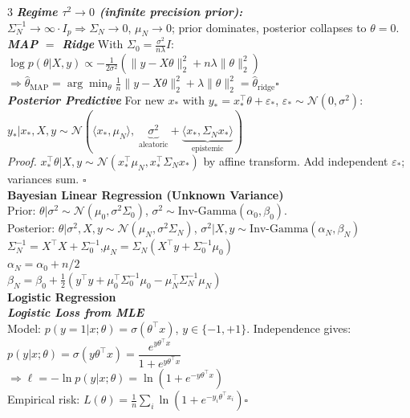 \documentclass[a4paper,7pt]{article}
\begin{document}
\begin{multicols*}{3}
\textit{\textbf{Regime $\tau^2\to 0$ (infinite precision prior):}}\\
$\Sigma_N^{-1}\to\infty\cdot I_p\Rightarrow\Sigma_N\to 0$, $\mu_N\to 0$; prior dominates, posterior collapses to $\theta=0$.\\

\textit{\textbf{MAP $=$ Ridge}} With $\Sigma_0=\frac{\sigma^2}{n\lambda}I$:\\
$\log p(\theta|X,y)\propto-\tfrac{1}{2\sigma^2}(\|y-X\theta\|_2^2+n\lambda\|\theta\|_2^2)$\\
$\Rightarrow\hat\theta_\mathrm{MAP}=\arg\min_\theta\tfrac{1}{n}\|y-X\theta\|_2^2+\lambda\|\theta\|_2^2=\hat\theta_\mathrm{ridge}$\hfill$\square$\\

\textit{\textbf{Posterior Predictive}} For new $x_*$ with $y_*=x_*^\top\theta+\varepsilon_*$, $\varepsilon_*\sim\mathcal{N}(0,\sigma^2)$:\\
$y_*|x_*,X,y\sim\mathcal{N}(\langle x_*,\mu_N\rangle,\;\underbrace{\sigma^2}_{\text{aleatoric}}+\underbrace{\langle x_*,\Sigma_N x_*\rangle}_{\text{epistemic}})$\\
\textit{Proof.} $x_*^\top\theta|X,y\sim\mathcal{N}(x_*^\top\mu_N,x_*^\top\Sigma_N x_*)$ by affine transform. Add independent $\varepsilon_*$; variances sum. \hfill$\square$\\

\textbf{Bayesian Linear Regression (Unknown Variance)}\\
Prior: $\theta|\sigma^2\sim\mathcal{N}(\mu_0,\sigma^2\Sigma_0)$, $\sigma^2\sim\mathrm{Inv\text{-}Gamma}(\alpha_0,\beta_0)$.\\
Posterior: $\theta|\sigma^2,X,y\sim\mathcal{N}(\mu_N,\sigma^2\Sigma_N)$, $\sigma^2|X,y\sim\mathrm{Inv\text{-}Gamma}(\alpha_N,\beta_N)$\\
$\Sigma_N^{-1}=X^\top X+\Sigma_0^{-1}$,\quad $\mu_N=\Sigma_N(X^\top y+\Sigma_0^{-1}\mu_0)$\\
$\alpha_N=\alpha_0+n/2$\\
$\beta_N=\beta_0+\tfrac{1}{2}(y^\top y+\mu_0^\top\Sigma_0^{-1}\mu_0-\mu_N^\top\Sigma_N^{-1}\mu_N)$\\

\textbf{Logistic Regression}\\

\textit{\textbf{Logistic Loss from MLE}}\\
Model: $p(y=1|x;\theta)=\sigma(\theta^\top x)$, $y\in\{-1,+1\}$. Independence gives:\\
$p(y|x;\theta)=\sigma(y\theta^\top x)=\dfrac{e^{y\theta^\top x}}{1+e^{y\theta^\top x}}$\\
$\Rightarrow\ell=-\ln p(y|x;\theta)=\ln(1+e^{-y\theta^\top x})$\\
Empirical risk: $L(\theta)=\frac{1}{n}\sum_i\ln(1+e^{-y_i\theta^\top x_i})$\hfill$\square$\\


\end{multicols*}
\end{document}
